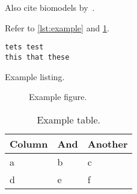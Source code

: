 Also cite biomodels by~\citeauthor{malik2020biomodels}.

Refer to \cref{lst:example} and \cref{fig:example}.

\begin{listing}
\begin{lstlisting}
tets test
this that these
\end{lstlisting}
\caption[Example]{Example listing.}
\label{lst:example}
\end{listing}

\begin{figure}
\begin{center}\end{center}
\caption[Example]{Example figure.}
\label{fig:example}
\end{figure}

\begin{table}\tablefont
\begin{tabular}{lll}
\toprule
Column & And & Another \\
\midrule
a & b & c \\
d & e & f \\
\bottomrule
\end{tabular}
\caption[Example]{Example table.}
\label{tab:example}
\end{table}
\fi
